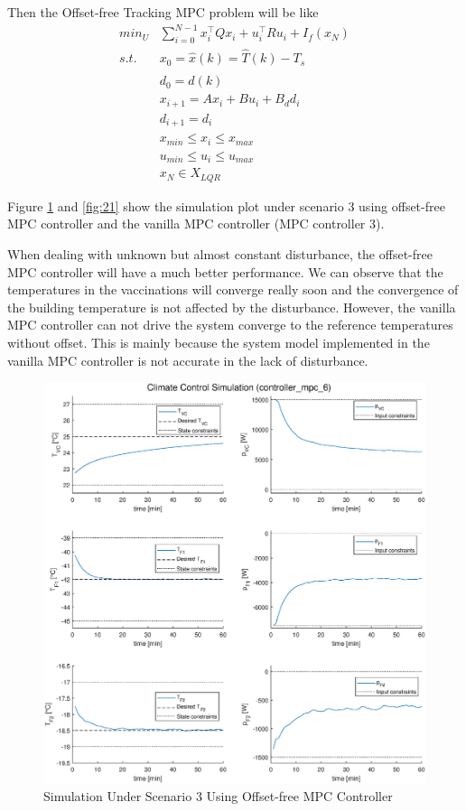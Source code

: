 \documentclass[a4paper,twoside,11pt]{article}
\numberwithin{equation}{section}
\begin{document}
Then the Offset-free Tracking MPC problem will be like
\begin{equation}
\begin{split}
    min_U & \sum_{i=0}^{N-1}x_i^\top Q x_i+u_i^\top R u_i + I_f(x_{N}) \\
    s.t. \quad & x_0 = \hat{x}(k) = \hat{T}(k) - T_s \\
    & d_0 = \hat{d}(k) \\
    & x_{i+1} = Ax_i + Bu_i + B_d d_i \\
    & d_{i+1} = d_i \\
    & x_{min} \le x_i \le x_{max} \\
    & u_{min} \le u_i \le u_{max} \\
    & x_N \in X_{LQR}
\end{split}
\end{equation}

Figure \ref{fig:20} and \ref{fig:21} show the simulation plot under scenario 3 using offset-free MPC controller and the vanilla MPC controller (MPC controller 3). 

When dealing with unknown but almost constant disturbance, the offset-free MPC controller will have a much better performance. We can observe that the temperatures in the vaccinations will converge really soon and the convergence of the building temperature is not affected by the disturbance. However, the vanilla MPC controller can not drive the system converge to the reference temperatures without offset. This is mainly because the system model implemented in the vanilla MPC controller is not accurate in the lack of disturbance. 

\newpage

\begin{figure}[ht]
\centering
\includegraphics[scale = 0.58]{image/23-1.eps}
\caption{Simulation Under Scenario 3 Using Offset-free MPC Controller}
\label{fig:20}
\end{figure}
\end{document}
